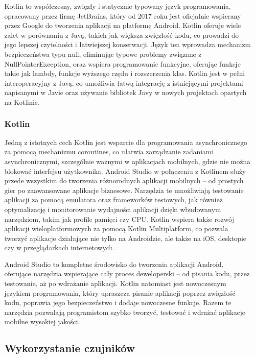 Kotlin to współczesny, zwięzły i statycznie typowany język programowania, opracowany przez firmę JetBrains, który od 2017 roku jest oficjalnie wspierany przez Google do tworzenia aplikacji na platformę Android. Kotlin oferuje wiele zalet w porównaniu z Javą, takich jak większa zwięzłość kodu, co prowadzi do jego lepszej czytelności i łatwiejszej konserwacji. Język ten wprowadza mechanizm bezpieczeństwa typu null, eliminując typowe problemy związane z NullPointerException, oraz wspiera programowanie funkcyjne, oferując funkcje takie jak lambdy, funkcje wyższego rzędu i rozszerzenia klas. Kotlin jest w pełni interoperacyjny z Javą, co umożliwia łatwą integrację z istniejącymi projektami napisanymi w Javie oraz używanie bibliotek Javy w nowych projektach opartych na Kotlinie.
\subsubsection{Kotlin}

Jedną z istotnych cech Kotlin jest wsparcie dla programowania asynchronicznego za pomocą mechanizmu coroutines, co ułatwia zarządzanie zadaniami asynchronicznymi, szczególnie ważnymi w aplikacjach mobilnych, gdzie nie można blokować interfejsu użytkownika. Android Studio w połączeniu z Kotlinem służy przede wszystkim do tworzenia różnorodnych aplikacji mobilnych – od prostych gier po zaawansowane aplikacje biznesowe. Narzędzia te umożliwiają testowanie aplikacji za pomocą emulatora oraz frameworków testowych, jak również optymalizację i monitorowanie wydajności aplikacji dzięki wbudowanym narzędziom, takim jak profile pamięci czy CPU. Kotlin wspiera także rozwój aplikacji wieloplatformowych za pomocą Kotlin Multiplatform, co pozwala tworzyć aplikacje działające nie tylko na Androidzie, ale także na iOS, desktopie czy w przeglądarkach internetowych.

Android Studio to kompletne środowisko do tworzenia aplikacji Android, oferujące narzędzia wspierające cały proces deweloperski – od pisania kodu, przez testowanie, aż po wdrażanie aplikacji. Kotlin natomiast jest nowoczesnym językiem programowania, który upraszcza pisanie aplikacji poprzez zwięzłość kodu, poprawia jego bezpieczeństwo i dodaje nowoczesne funkcje. Razem te narzędzia pozwalają programistom szybko tworzyć, testować i wdrażać aplikacje mobilne wysokiej jakości.

\subsection{Wykorzystanie czujników}

